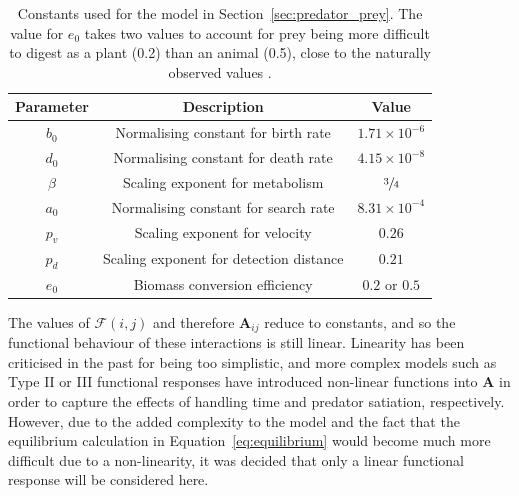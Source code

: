 \begin{table}
  \centering
  \caption[Values of constants used for the model in Section~\ref{sec:predator_prey}]{Constants used for the model in Section~\ref{sec:predator_prey}. The value for $e_0$ takes two values to account for prey being more difficult to digest as a plant (0.2) than an animal (0.5), close to the naturally observed values \citep{Lindeman1942, Kozlovsky1968}.}
  \setlength{\tabcolsep}{1em} %
  {\renewcommand{\arraystretch}{1.25}%
  \begin{tabular}{|c|c|c|}
    \hline
    Parameter & Description & Value
    \\\hline\hline
    $b_0$ & Normalising constant for birth rate & $1.71\times10^{-6}$
    \\\hline
    $d_0$ & Normalising constant for death rate & $4.15\times10^{-8}$
    \\\hline
    $\beta$ & Scaling exponent for metabolism & $\sfrac{3}{4}$
    \\\hline
    $a_0$ & Normalising constant for search rate & $8.31\times10^{-4}$
    \\\hline
    $p_v$ & Scaling exponent for velocity & $0.26$
    \\\hline
    $p_d$ & Scaling exponent for detection distance & $0.21$
    \\\hline
    $e_0$ & Biomass conversion efficiency & $0.2$ or $0.5$
    \\\hline
  \end{tabular}}
  \label{tab:lotka_volterra_constants}
\end{table}

The values of $\mathcal{F}(i,j)$ and therefore $\mathbf{A}_{ij}$ reduce to constants, and so the functional behaviour of these interactions is still linear. Linearity has been criticised in the past for being too simplistic, and more complex models such as Type II or III functional responses \citep{Holling1973} have introduced non-linear functions into $\mathbf{A}$ in order to capture the effects of handling time and predator satiation, respectively.
However, due to the added complexity to the model and the fact that the equilibrium calculation in Equation~\eqref{eq:equilibrium} would become much more difficult due to a non-linearity, it was decided that only a linear functional response will be considered here.

